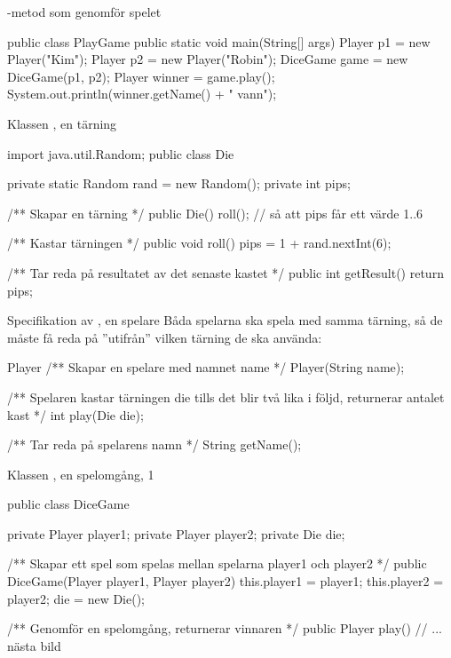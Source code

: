 \documentclass{lecturenotes}
\begin{document}
\begin{Slide}
{-metod som genomför spelet}
\begin{Code}
public class PlayGame {
    public static void main(String[] args) {
        Player p1 = new Player("Kim");
        Player p2 = new Player("Robin");
        DiceGame game = new DiceGame(p1, p2);
        Player winner = game.play();
        System.out.println(winner.getName() +  " vann");
    }
}
\end{Code}
\end{Slide} 

\begin{Slide}
{Klassen , en tärning}
\begin{Code}
import java.util.Random;
public class Die {
    private static Random rand = new Random();
    private int pips;

    /** Skapar en tärning */
    public Die() {
        roll(); // så att pips får ett värde 1..6
    }
    
    /** Kastar tärningen */
    public void roll() {
        pips = 1 + rand.nextInt(6);
    }
    
    /** Tar reda på resultatet av det senaste kastet */
    public int getResult() {
        return pips;
    }
}
\end{Code}
\end{Slide} 

\begin{Slide}
{Specifikation av , en spelare}
Båda spelarna ska spela med samma tärning, så de måste få reda på ''utifrån'' vilken tärning de ska använda:

\begin{ClassSpec}{Player}
/** Skapar en spelare med namnet name */
Player(String name);

/** Spelaren kastar tärningen die tills det blir 
    två lika i följd, returnerar antalet kast */
int play(Die die);

/** Tar reda på spelarens namn */
String getName();
\end{ClassSpec}
\end{Slide} 

\begin{Slide}
{Klassen , en spelomgång, 1}
\begin{Code}
public class DiceGame {
    private Player player1;
    private Player player2;
    private Die die;
    
    /** Skapar ett spel som spelas mellan spelarna
        player1 och player2 */
    public DiceGame(Player player1, Player player2) {
        this.player1 = player1;
        this.player2 = player2;
        die = new Die();
    }
    
    /** Genomför en spelomgång, returnerar vinnaren */
    public Player play() {
        // ... nästa bild
    }
}
\end{Code}
\end{Slide} 
\end{document}
